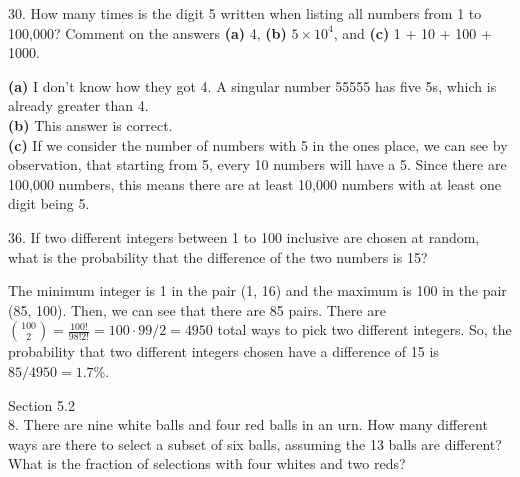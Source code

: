 \documentclass[12pt]{article}
\begin{document}
30. How many times is the digit 5 written when listing all numbers
from 1 to 100,000? Comment on the answers \textbf{(a)} 4, \textbf{(b)} 
$5\times10^4$, and \textbf{(c)} 1 + 10 + 100 + 1000. 
\begin{solution}
    \textbf{(a)} I don't know how they got 4. A singular number 
    55555 has five 5s, which is already greater than 4. \\
    \textbf{(b)} This answer is correct. \\
    \textbf{(c)} If we consider the number of numbers with 5 in 
    the ones place, we can see by observation, that starting from 5, 
    every 10 numbers will have a 5. Since there are 100,000 numbers, 
    this means there are at least 10,000 numbers with at least one 
    digit being 5. 
\end{solution}

36. If two different integers between 1 to 100 inclusive are chosen
at random, what is the probability that the difference of the two 
numbers is 15? 
\begin{solution}
    The minimum integer is 1 in the pair (1, 16) and the maximum is 
    100 in the pair (85, 100). Then, we can see that there are 85 
    pairs. There are $\binom{100}{2}=\frac{100!}{98!2!}=100\cdot99/2
    =4950$ total ways to pick two different integers. So, the 
    probability that two different integers chosen have a difference
    of 15 is $85/4950 = 1.7\%$. 
\end{solution}

Section 5.2 \\
8. There are nine white balls and four red balls in an urn. How
many different ways are there to select a subset of six balls, 
assuming the 13 balls are different? What is the fraction of 
selections with four whites and two reds? 
\begin{solution}
    
\end{solution}
\end{document}

